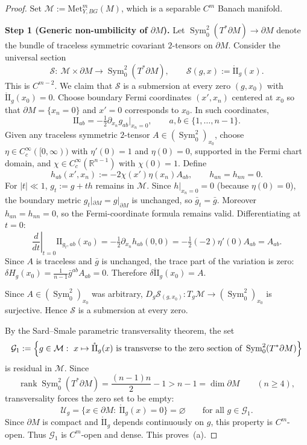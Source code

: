 \documentclass[11pt,reqno,a4paper]{amsart}
\numberwithin{equation}{section}
\theoremstyle{plain}
\theoremstyle{remark}
\theoremstyle{plain}
\begin{document}
\begin{proof}
Set $\mathcal M:=\mathrm{Met}^m_{Y,BG}(M)$, which is a separable $C^m$ Banach manifold.

\medskip\noindent
\textbf{Step 1 (Generic non-umbilicity of $\partial M$).}
Let $\operatorname{Sym}_0^2(T^*\partial M)\to\partial M$ denote the bundle of
traceless symmetric covariant $2$-tensors on $\partial M$.
Consider the universal section
\[
\mathcal S:\ \mathcal M\times\partial M\longrightarrow \operatorname{Sym}_0^2(T^*\partial M),
\qquad
\mathcal S(g,x):=\mathring{\mathrm{II}}_g(x).
\]
This is $C^{m-2}$.
We claim that $\mathcal S$ is a submersion at every zero $(g,x_0)$ with
$\mathring{\mathrm{II}}_g(x_0)=0$.
Choose boundary Fermi coordinates $(x',x_n)$ centered at $x_0$ so that
$\partial M=\{x_n=0\}$ and $x'=0$ corresponds to $x_0$.
In such coordinates,
\[
\mathrm{II}_{ab}=-\tfrac12\partial_{x_n}g_{ab}\Big|_{x_n=0},
\qquad a,b\in\{1,\dots,n-1\}.
\]
Given any traceless symmetric $2$-tensor $A\in(\operatorname{Sym}_0^2)_{x_0}$,
choose $\eta\in C^\infty_c([0,\infty))$ with $\eta'(0)=1$ and $\eta(0)=0$,
supported in the Fermi chart domain, and $\chi\in C^\infty_c(\mathbb R^{n-1})$
with $\chi(0)=1$.
Define
\[
h_{ab}(x',x_n):=-2\chi(x')\eta(x_n)A_{ab},
\qquad
h_{an}=h_{nn}=0.
\]
For $|t|\ll1$, $g_t:=g+th$ remains in $\mathcal M$.
Since $h|_{x_n=0}=0$ (because $\eta(0)=0$), the boundary metric
$g_t|_{\partial M}=g|_{\partial M}$ is unchanged, so $\bar g_t=\bar g$.
Moreover $h_{an}=h_{nn}=0$, so the Fermi-coordinate formula remains valid.
Differentiating at $t=0$:
\[
\left.\frac{d}{dt}\right|_{t=0}\mathrm{II}_{g_t,ab}(x_0)
=-\tfrac12\partial_{x_n}h_{ab}(0,0)
=-\tfrac12(-2)\eta'(0)A_{ab}
=A_{ab}.
\]
Since $A$ is traceless and $\bar g$ is unchanged, the trace part of the
variation is zero:
$\delta H_g(x_0)=\frac{1}{n-1}\bar g^{ab}A_{ab}=0$.
Therefore
$\delta\mathring{\mathrm{II}}_g(x_0)=A$.

Since $A\in(\operatorname{Sym}_0^2)_{x_0}$ was arbitrary,
$D_g\mathcal S_{(g,x_0)}:T_g\mathcal M\to(\operatorname{Sym}_0^2)_{x_0}$
is surjective.  Hence $\mathcal S$ is a submersion at every zero.

By the Sard--Smale parametric transversality theorem, the set
\[
\mathcal G_1
:=\Bigl\{g\in\mathcal M:\ x\mapsto\mathring{\mathrm{II}}_g(x)
\ \text{is transverse to the zero section of }
\operatorname{Sym}_0^2(T^*\partial M)\Bigr\}
\]
is residual in $\mathcal M$.  Since
\[
\operatorname{rank}\operatorname{Sym}_0^2(T^*\partial M)
=\frac{(n-1)n}{2}-1
>n-1=\dim\partial M
\qquad(n\ge4),
\]
transversality forces the zero set to be empty:
\[
\mathcal U_g=\{x\in\partial M:\ \mathring{\mathrm{II}}_g(x)=0\}
=\varnothing
\qquad\text{for all }g\in\mathcal G_1.
\]
Since $\partial M$ is compact and $\mathring{\mathrm{II}}_g$ depends continuously
on $g$, this property is $C^m$-open.
Thus $\mathcal G_1$ is $C^m$-open and dense.
This proves~\textup{(a)}.


\end{proof}
\end{document}
